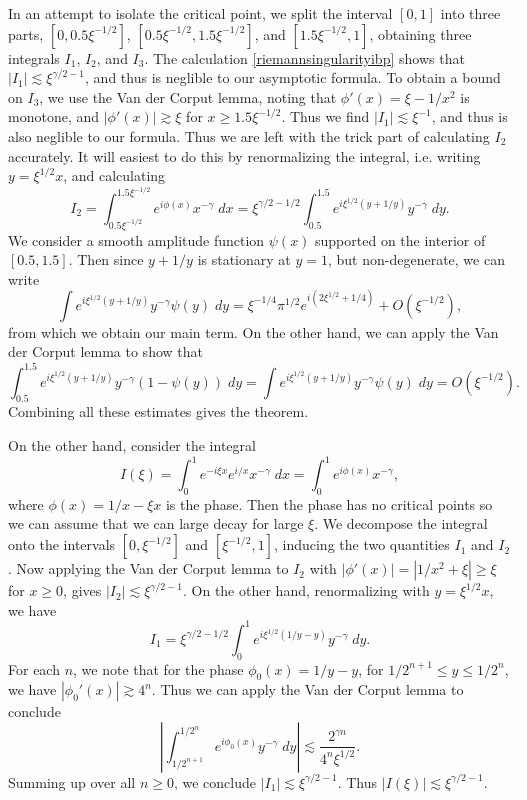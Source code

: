 \begin{example}
  In an attempt to isolate the critical point, we split the interval $[0,1]$ into three parts, $[0,0.5 \xi^{-1/2}]$, $[0.5 \xi^{-1/2},1.5 \xi^{-1/2}]$, and $[1.5 \xi^{-1/2},1]$, obtaining three integrals $I_1$, $I_2$, and $I_3$. The calculation \eqref{riemannsingularityibp} shows that $|I_1| \lesssim \xi^{\gamma/2 - 1}$, and thus is neglible to our asymptotic formula. To obtain a bound on $I_3$, we use the Van der Corput lemma, noting that $\phi'(x) = \xi - 1/x^2$ is monotone, and $|\phi'(x)| \gtrsim \xi$ for $x \geq 1.5 \xi^{-1/2}$. Thus we find $|I_1| \lesssim \xi^{-1}$, and thus is also neglible to our formula. Thus we are left with the trick part of calculating $I_2$ accurately. It will easiest to do this by renormalizing the integral, i.e. writing $y = \xi^{1/2} x$, and calculating
  \[ I_2 = \int_{0.5 \xi^{-1/2}}^{1.5 \xi^{-1/2}} e^{i \phi(x)} x^{-\gamma}\; dx = \xi^{\gamma/2 - 1/2} \int_{0.5}^{1.5} e^{i \xi^{1/2}(y + 1/y)} y^{-\gamma}\; dy. \]
  We consider a smooth amplitude function $\psi(x)$ supported on the interior of $[0.5,1.5]$. Then since $y + 1/y$ is stationary at $y = 1$, but non-degenerate, we can write
  \[ \int e^{i \xi^{1/2}(y + 1/y)} y^{-\gamma} \psi(y)\; dy = \xi^{-1/4} \pi^{1/2} e^{i(2\xi^{1/2} + 1/4)} + O(\xi^{-1/2}), \]
  from which we obtain our main term. On the other hand, we can apply the Van der Corput lemma to show that
  \[ \int_{0.5}^{1.5} e^{i \xi^{1/2}(y + 1/y)} y^{-\gamma} (1 - \psi(y))\; dy = \int e^{i \xi^{1/2}(y + 1/y)} y^{-\gamma} \psi(y)\; dy = O(\xi^{-1/2}). \]
  Combining all these estimates gives the theorem.

  On the other hand, consider the integral
  \[ I(\xi) = \int_0^1 e^{-i \xi x} e^{i/x} x^{-\gamma}\; dx = \int_0^1 e^{i \phi(x)} x^{-\gamma}, \]
  where $\phi(x) = 1/x - \xi x$ is the phase. Then the phase has no critical points so we can assume that we can large decay for large $\xi$. We decompose the integral onto the intervals $[0,\xi^{-1/2}]$ and $[\xi^{-1/2},1]$, inducing the two quantities $I_1$ and $I_2$. Now applying the Van der Corput lemma to $I_2$ with $|\phi'(x)| = |1/x^2 + \xi| \geq \xi$ for $x \geq 0$, gives $|I_2| \lesssim \xi^{\gamma/2 - 1}$. On the other hand, renormalizing with $y = \xi^{1/2} x$, we have
  \[ I_1 = \xi^{\gamma/2 - 1/2} \int_0^1 e^{i \xi^{1/2} (1/y - y)} y^{-\gamma}\; dy. \]
  For each $n$, we note that for the phase $\phi_0(x) = 1/y - y$, for $1/2^{n+1} \leq y \leq 1/2^n$, we have $|\phi_0'(x)| \gtrsim 4^n$. Thus we can apply the Van der Corput lemma to conclude
  \[ \left| \int_{1/2^{n+1}}^{1/2^n} e^{i \phi_0(x)} y^{-\gamma}\; dy \right| \lesssim \frac{2^{\gamma n}}{4^n \xi^{1/2}}. \]
  Summing up over all $n \geq 0$, we conclude $|I_1| \lesssim \xi^{\gamma/2 - 1}$. Thus $|I(\xi)| \lesssim \xi^{\gamma/2 - 1}$.


\end{example}
